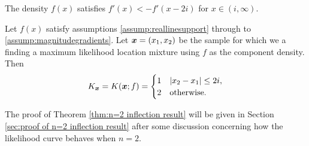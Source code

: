 
			
		
		\begin{assumption}
			The density $f(x)$ satisfies $f'(x) < -f'(x - 2i)$ for $x \in (i,\infty)$.
			\label{assump:magnitudegradients}
		\end{assumption}

		\begin{theorem}
			\label{thm:n=2 inflection result}
			Let $f(x)$ satisfy assumptions \ref{assump:reallinesupport} through to \ref{assump:magnitudegradients}. Let ${\bm{{x}}} = (x_1,x_2)$ be the sample for which we a finding a maximum likelihood location mixture using $f$ as the component density. Then 
			\begin{equation}
				K_{\bm{{x}}} = K({\bm{{x}}};f) = 
					\begin{cases}
						1 &|x_2 - x_1| \leq 2i,\\
						2 &\text{otherwise.}
					\end{cases}
			\end{equation}
		\end{theorem}

		The proof of Theorem \ref{thm:n=2 inflection result} will be given in Section \ref{sec:proof of n=2 inflection result} after some discussion concerning how the likelihood curve behaves when $n = 2$.


